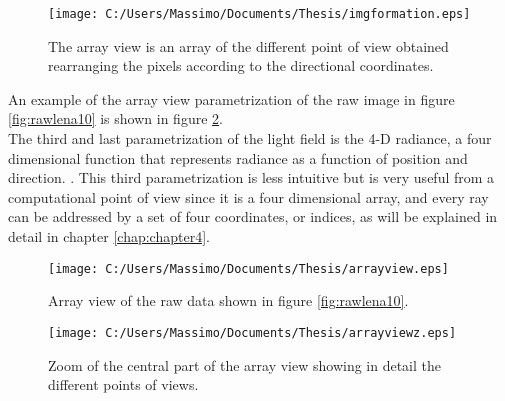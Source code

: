 \begin{figure}[H]
	\centering
	\texttt{[image: C:/Users/Massimo/Documents/Thesis/imgformation.eps]}
	\caption{\label{fig:arrayview}The array view is an array of the different point of view obtained rearranging the pixels according to the directional coordinates.  }
\end{figure}
An example of the array view parametrization of the raw image in figure \ref{fig:rawlena10} is shown in figure \ref{fig:arrayview1}.\\
The third and last parametrization of the light field is the 4-D radiance, a four dimensional function that represents radiance as a function of position and direction. \cite{levoy1996light}. This third parametrization is less intuitive but is very useful from a computational point of view since it is a four dimensional array, and every ray can be addressed by a set of four coordinates, or indices, as will be explained in detail in chapter \ref{chap:chapter4}.
\newpage
\begin{figure}[H]
	\centering
	\texttt{[image: C:/Users/Massimo/Documents/Thesis/arrayview.eps]}
	\caption{\label{fig:arrayview1}Array view of the raw data shown in figure \ref{fig:rawlena10}.  }
\end{figure}
\begin{figure}[H]
	\centering
	\texttt{[image: C:/Users/Massimo/Documents/Thesis/arrayviewz.eps]}
	\caption{\label{fig:arrayview1z}Zoom of the central part of the array view showing in detail the different points of views.  }
\end{figure}
\newpage
